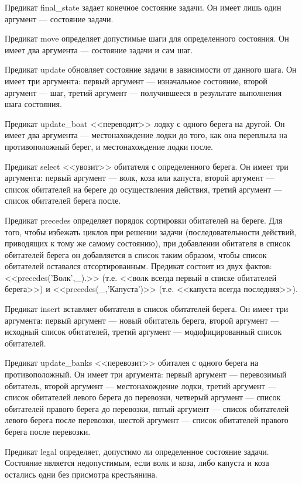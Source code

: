 \documentclass{article}
\begin{document}
Предикат final\_state задает конечное состояние задачи. Он имеет лишь
один аргумент --- состояние задачи.

Предикат move определяет допустимые шаги для определенного состояния. Он имеет два аргумента --- состояние задачи и сам шаг.

Предикат update обновляет состояние задачи в зависимости от данного
шага. Он имеет три аргумента: первый аргумент --- изначальное
состояние, второй аргумент --- шаг, третий аргумент --- получившееся в
результате выполнения шага состояния.

Предикат update\_boat <<переводит>> лодку с одного берега на
другой. Он имеет два аргумента --- местонахождение лодки до того, как
она переплыла на противоположный берег, и местонахождение лодки после.

Предикат select <<увозит>> обитателя с определенного
берега. Он имеет три аргумента: первый аргумент --- волк, коза или
капуста, второй аргумент --- список обитателей на береге до
осуществления действия, третий аргумент --- список обитателей берега после.

Предикат precedes определяет порядок сортировки обитателей на
береге. Для того, чтобы избежать циклов при решении задачи
(последовательности действий, приводящих к тому же самому состоянию),
при добавлении обитателя в список обитателей берега он добавляется в
список таким образом, чтобы список обитателей оставался
отсортированным. Предикат состоит из двух фактов:
<<precedes('Волк',\_).>> (т.е. <<волк всегда первый в списке
обитателей берега>>) и <<precedes(\_,'Капуста')>> (т.е. <<капуста
всегда последняя>>).

Предикат insert вставляет обитателя в список обитателей берега. Он
имеет три аргумента: первый аргумент --- новый обитатель берега,
второй аргумент --- исходный список обитателей, третий аргумент ---
модифицированный список обитателей.

Предикат update\_banks <<перевозит>> обиталея с одного берега на
противоположный. Он имеет три аргумента: первый аргумент ---
перевозимый обитатель, второй аргумент --- местонахождение лодки,
третий аргумент --- список обитателей левого берега до перевозки,
четверый аргумент --- список обитателей правого берега до перевозки,
пятый аргумент --- список обитателей левого берега после перевозки,
шестой аргумент --- список обитателей правого берега после перевозки.

Предикат legal определяет, допустимо ли определенное состояние
задачи. Состояние является недопустимым, если волк и коза, либо
капуста и коза остались одни без присмотра крестьянина.
\end{document}
